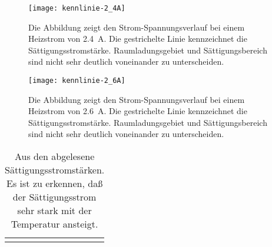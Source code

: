 \begin{figure}
  \centering
  \texttt{[image: kennlinie-2\_4A]}
  \caption{Die Abbildung zeigt den Strom-Spannungsverlauf bei einem
    Heizstrom von \SI{2.4}{\ampere}. Die gestrichelte Linie kennzeichnet
    die Sättigungsstromstärke. Raumladungsgebiet und Sättigungsbereich
    sind nicht sehr deutlich voneinander zu unterscheiden.}
  \label{fig:kennlinie-2.4A}
\end{figure}

\begin{figure}
  \centering
  \texttt{[image: kennlinie-2\_6A]}
  \caption{Die Abbildung zeigt den Strom-Spannungsverlauf bei einem
    Heizstrom von \SI{2.6}{\ampere}. Die gestrichelte Linie kennzeichnet
    die Sättigungsstromstärke. Raumladungsgebiet und Sättigungsbereich
    sind nicht sehr deutlich voneinander zu unterscheiden.}
  \label{fig:kennlinie-2.6A}
\end{figure}

\begin{table}
  \centering
  \begin{tabular}{rSSS}
    \toprule
    & {} & {} & \\
    \midrule
    \\
    \bottomrule
  \end{tabular}
  \caption{Aus den 
    abgelesene Sättigungsstromstärken. Es ist zu erkennen, daß der
    Sättigungsstrom sehr stark mit der Temperatur ansteigt.}
  \label{tab:saettigung}
\end{table}
